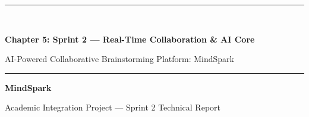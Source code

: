 \documentclass[11pt,a4paper,oneside]{report}
\begin{document}
\begin{titlepage}
  \thispagestyle{empty}
  \vspace*{3.5cm}
  {\color{mindNavy}\rule{\textwidth}{1.5pt}}\\[14pt]
  {\Huge\bfseries\color{mindNavy} Chapter 5: Sprint 2 — Real-Time Collaboration \& AI Core\par}
  \vspace{10pt}
  {\Large\color{mindSlate} AI-Powered Collaborative Brainstorming Platform: MindSpark\par}
  \vspace{12pt}
  {\color{mindNavy}\rule{\textwidth}{1.5pt}}
  \vfill
  {\large\bfseries\color{mindNavy} MindSpark\par}
  \vspace{4pt}
  {\small\color{mindSlate} Academic Integration Project — Sprint 2 Technical Report\par}
\end{titlepage}

\setcounter{tocdepth}{3}
\tableofcontents
\cleardoublepage

\setcounter{page}{1}
\setcounter{chapter}{4}




\end{document}
